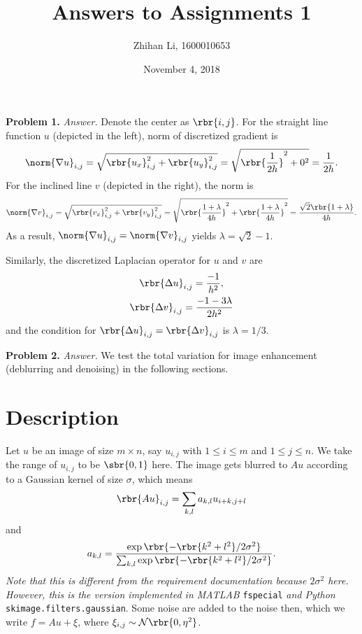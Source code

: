 \documentclass[english, nochinese]{pnote}
\title{Answers to Assignments 1}
\author{Zhihan Li, 1600010653}
\date{November 4, 2018}
\begin{document}
\maketitle

\textbf{Problem 1.} \textit{Answer.} Denote the center as $ \rbr{ i, j } $. For the straight line function $u$ (depicted in the left), norm of discretized gradient is
\begin{equation}
\norm{ \nabla u }_{ i, j } = \sqrt{ \rbr{u_x}_{ i, j }^2 + \rbr{u_y}_{ i, j } ^2 } = \sqrt{ \rbr{\frac{1}{ 2 h }}^2 + 0^2 } = \frac{1}{ 2 h }.
\end{equation}
For the inclined line $v$ (depicted in the right), the norm is
\begin{equation}
\norm{ \nabla v }_{ i, j } = \sqrt{ \rbr{v_x}_{ i, j }^2 + \rbr{v_y}_{ i, j } ^2 } = \sqrt{ \rbr{\frac{ 1 + \lambda }{ 4 h }}^2 + \rbr{\frac{ 1 + \lambda }{ 4 h }}^2 } = \frac{ \sqrt{2} \rbr{ 1 + \lambda } }{ 4 h }.
\end{equation}
As a result, $ \norm{ \nabla u }_{ i, j } = \norm{ \nabla v }_{ i, j } $ yields $ \lambda = \sqrt{2} - 1 $.

Similarly, the discretized Laplacian operator for $u$ and $v$ are
\begin{gather}
\rbr{ \Delta u }_{ i, j } = \frac{-1}{h^2}, \\
\rbr{ \Delta v }_{ i, j } = \frac{ -1 - 3 \lambda }{ 2 h^2 }
\end{gather}
and the condition for $ \rbr{ \Delta u }_{ i, j } = \rbr{ \Delta v }_{ i, j } $ is $ \lambda = 1 / 3 $.

\textbf{Problem 2.} \textit{Answer.} We test the total variation for image enhancement (deblurring and denoising) in the following sections.

\section{Description}

Let $u$ be an image of size $ m \times n $, say $ u_{ i, j } $ with $ 1 \le i \le m $ and $ 1 \le j \le n $. We take the range of $ u_{ i, j } $ to be $ \sbr{ 0, 1 } $ here. The image gets blurred to $ A u $ according to a Gaussian kernel of size $\sigma$, which means
\begin{equation}
\rbr{ A u }_{ i, j } = \sum_{ k, l } a_{ k, l } u_{ i + k, j + l }
\end{equation}
and
\begin{equation}
a_{ k, l } = \frac{ \exp \rbr{ -\rbr{ k^2 + l^2 } / 2 \sigma^2 } }{ \sum_{ k, l } \exp \rbr{ -\rbr{ k^2 + l^2 } / 2 \sigma^2 } }.
\end{equation}
\emph{Note that this is different from the requirement documentation because $ 2 \sigma^2 $ here. However, this is the version implemented in MATLAB} \verb"fspecial" \emph{and Python} \verb"skimage.filters.gaussian". Some noise are added to the noise then, which we write $ f = A u + \xi $, where $ \xi_{ i, j } \sim \mathcal{N} \rbr{ 0, \eta^2 } $.
\end{document}
